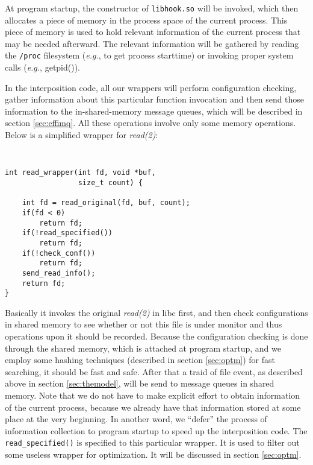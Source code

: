 \documentclass[letterpaper,twocolumn,10pt]{article}
\begin{document}
At program startup, the constructor of \texttt{libhook.so} will be invoked,
which then allocates a piece of memory in the process space of the current
process. This piece of memory is used to hold relevant information of the
current process that may be needed afterward. The relevant information will
be gathered by reading the \texttt{/proc} filesystem (\textit{e.g.}, to get
process starttime) or invoking proper system calls (\textit{e.g.}, getpid()). 

In the interposition code, all our wrappers will perform configuration
checking, gather information about this particular function invocation and
then send those information to the in-shared-memory message queues, which
will be described in section \ref{sec:effimq}. All these operations involve
only some memory operations. Below is a simplified wrapper for
\textit{read(2)}: 

{\tt \small
\begin{verbatim}
int read_wrapper(int fd, void *buf,
                 size_t count) {

    int fd = read_original(fd, buf, count);
    if(fd < 0)
        return fd;
    if(!read_specified())
        return fd;
    if(!check_conf())
        return fd;
    send_read_info();
    return fd;
}
\end{verbatim}
}

\noindent
Basically it invokes the original \textit{read(2)} in libc first, and then
check configurations in shared memory to see whether or not this file is
under monitor and thus operations upon it should be recorded. Because the
configuration checking is done through the shared memory, which is attached
at program startup, and we employ some hashing techniques (described in
section \ref{sec:optm}) for fast searching, it should be fast and safe. After
that a traid of file event, as described above in section \ref{sec:themodel},
will be send to message queues in shared memory. Note that we do not have to
make explicit effort to obtain information of the current process, because we
already have that information stored at some place at the very beginning.
In another word, we ``defer'' the process of information
collection to program startup to speed up the interposition code. The
\texttt{read\_specified()} is specified to this particular wrapper. It is
used to filter out some useless wrapper for optimization. It will be
discussed in section \ref{sec:optm}.\\ 
\end{document}
